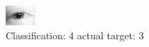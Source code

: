 \begin{figure}[h!]
\begin{center}
\includegraphics[width=0.60\columnwidth]{figures/ID59_class_4_target_3.png}
\end{center}
\caption{ Classification: 4 actual target: 3}
\label{fig:ID59_class_4_target_3}
\end{figure}
